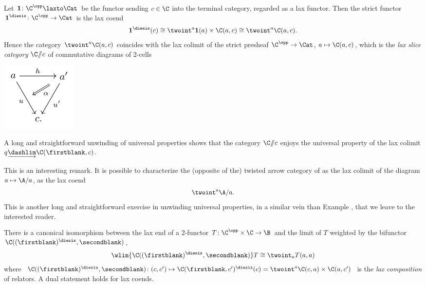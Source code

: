 \begin{example}
Let $\textbf{1}\colon \C^\opp\laxto \Cat$ be the functor sending $c\in\C$ into the terminal category, regarded as a lax functor. Then the strict functor $\textbf{1}^\diesis \colon \C^\opp\to \Cat$ is the lax coend
\[
\textbf{1}^\diesis(c) \cong \twoint^a \textbf{1}(a)\times \C(a,c)\cong \twoint^a \C(a,c).
\] 
Hence the category $\twoint^a \C(a,c)$ coincides with the lax colimit of the strict presheaf $\C^\opp\to \Cat$, $a\mapsto \C(a,c)$, which is \cite[p\@. \textbf{171}]{Street19} the \emph{lax slice category} $\C/\!\!/c$ of commutative diagrams of 2-cells
\begin{center}
\includegraphics[scale=1]{figures/fig20}
\end{center}
A long and straightforward unwinding of universal properties shows that the category $\C/\!\!/c$ enjoys the universal property of the lax colimit $q\underrightarrow{\dashlim}\C(\firstblank,c)$.
\end{example}
\begin{remark}
This is an interesting remark. It is possible to characterize the (opposite of the) twisted arrow category of \adef{} as the lax colimit of the diagram $a\mapsto \A/a$, \ie as the lax coend
\[
\twoint^a \A/a.
\]
This is another long and straightforward exercise in unwinding universal properties, in a similar vein than Example , that we leave to the interested reader.
\end{remark}
\begin{proposition}\label{lax.is.wcolim}
\cite[\S\textbf{2}]{bozapalides1980some} There is a canonical isomorphism between the lax end of a 2-functor $T\colon \C^\opp\times \C\to \B$ and the limit of $T$ weighted by the bifunctor $\C((\firstblank)^\diesis,\secondblank)$, \ie
\[
\wlim{\C((\firstblank)^\diesis,\secondblank)}T \cong \twoint_a T(a,a)
\]
where $\C((\firstblank)^\diesis,\secondblank)\colon (c, c')\mapsto \C(\firstblank,c')^\diesis(c)= \twoint^a \C(c,a)\times \C(a, c')$ is the \emph{lax composition} of relators. A dual statement holds for lax coends.
\end{proposition}
